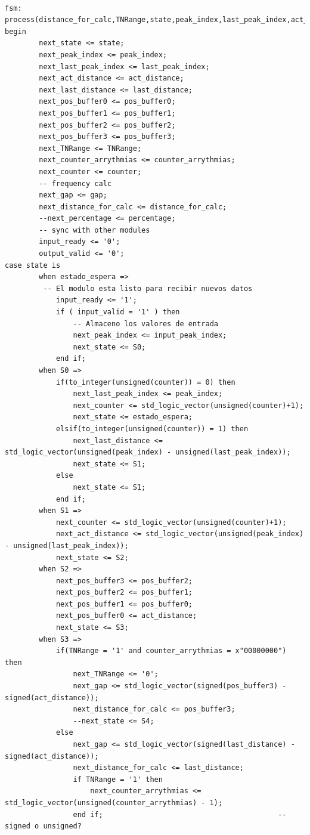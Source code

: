 \begin{lstlisting}[frame=single]

fsm: process(distance_for_calc,TNRange,state,peak_index,last_peak_index,act_distance,last_distance,pos_buffer0,pos_buffer1,pos_buffer2,pos_buffer3,counter_arrythmias,counter,gap,percentage,input_valid,input_peak_index,output_ready)
begin
        next_state <= state;
        next_peak_index <= peak_index;
        next_last_peak_index <= last_peak_index;
        next_act_distance <= act_distance;
        next_last_distance <= last_distance;
        next_pos_buffer0 <= pos_buffer0;
        next_pos_buffer1 <= pos_buffer1;
        next_pos_buffer2 <= pos_buffer2;
        next_pos_buffer3 <= pos_buffer3;
        next_TNRange <= TNRange;
        next_counter_arrythmias <= counter_arrythmias;
        next_counter <= counter; 
        -- frequency calc
        next_gap <= gap;
        next_distance_for_calc <= distance_for_calc;
        --next_percentage <= percentage;
        -- sync with other modules
        input_ready <= '0';
        output_valid <= '0';
case state is
        when estado_espera =>
         -- El modulo esta listo para recibir nuevos datos
            input_ready <= '1';
            if ( input_valid = '1' ) then
                -- Almaceno los valores de entrada
                next_peak_index <= input_peak_index;
                next_state <= S0;    
            end if;
        when S0 =>
            if(to_integer(unsigned(counter)) = 0) then
                next_last_peak_index <= peak_index;
                next_counter <= std_logic_vector(unsigned(counter)+1);
                next_state <= estado_espera; 
            elsif(to_integer(unsigned(counter)) = 1) then
                next_last_distance <= std_logic_vector(unsigned(peak_index) - unsigned(last_peak_index));
                next_state <= S1;
            else 
                next_state <= S1;
            end if;
        when S1 =>
            next_counter <= std_logic_vector(unsigned(counter)+1);
            next_act_distance <= std_logic_vector(unsigned(peak_index) - unsigned(last_peak_index));
            next_state <= S2;
        when S2 => 
            next_pos_buffer3 <= pos_buffer2;
            next_pos_buffer2 <= pos_buffer1;
            next_pos_buffer1 <= pos_buffer0;
            next_pos_buffer0 <= act_distance;
            next_state <= S3;
        when S3 => 
            if(TNRange = '1' and counter_arrythmias = x"00000000") then
                next_TNRange <= '0';
                next_gap <= std_logic_vector(signed(pos_buffer3) - signed(act_distance));
                next_distance_for_calc <= pos_buffer3;
                --next_state <= S4;
            else
                next_gap <= std_logic_vector(signed(last_distance) - signed(act_distance));
                next_distance_for_calc <= last_distance;
                if TNRange = '1' then
                    next_counter_arrythmias <= std_logic_vector(unsigned(counter_arrythmias) - 1);
                end if;                                         --signed o unsigned?


\end{lstlisting}
